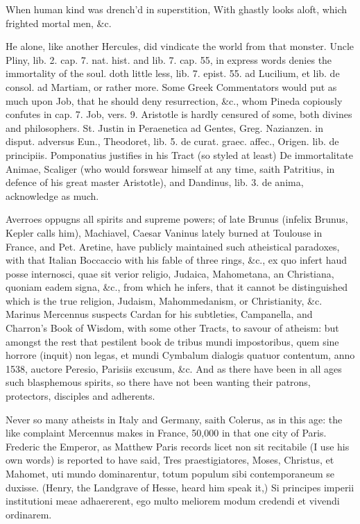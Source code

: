 {When human kind was drench'd in superstition,
With ghastly looks aloft, which frighted mortal men, \&c.

He alone, like another Hercules, did vindicate the world from that
monster. Uncle Pliny, lib. 2. cap. 7. nat. hist. and lib. 7. cap.
55, in express words denies the immortality of the soul. \Seneca
doth little less, lib. 7. epist. 55. ad Lucilium, et lib. de consol. ad
Martiam, or rather more. Some Greek Commentators would put as much upon
Job, that he should deny resurrection, \&c., whom Pineda copiously
confutes in cap. 7. Job, vers. 9. Aristotle is hardly censured of some,
both divines and philosophers. St. Justin in Peraenetica ad Gentes,
Greg. Nazianzen. in disput. adversus Eun., Theodoret, lib. 5. de curat.
graec. affec., Origen. lib. de principiis. Pomponatius justifies in his
Tract (so styled at least) De immortalitate Animae, Scaliger (who would
forswear himself at any time, saith Patritius, in defence of his great
master Aristotle), and Dandinus, lib. 3. de anima, acknowledge as much.

Averroes oppugns all spirits and supreme powers; of late Brunus
(infelix Brunus, Kepler calls him), Machiavel, Caesar Vaninus
lately burned at Toulouse in France, and Pet. Aretine, have publicly
maintained such atheistical paradoxes, with that Italian
Boccaccio with his fable of three rings, \&c., ex quo infert haud posse
internosci, quae sit verior religio, Judaica, Mahometana, an
Christiana, quoniam eadem signa, \&c., from which he infers, that it
cannot be distinguished which is the true religion, Judaism,
Mahommedanism, or Christianity, \&c. Marinus Mercennus suspects
Cardan for his subtleties, Campanella, and Charron's Book of Wisdom,
with some other Tracts, to savour of atheism: but amongst the
rest that pestilent book de tribus mundi impostoribus, quem sine
horrore (inquit) non legas, et mundi Cymbalum dialogis quatuor
contentum, anno 1538, auctore Peresio, Parisiis excusum, \&c. And
as there have been in all ages such blasphemous spirits, so there have
not been wanting their patrons, protectors, disciples and adherents.

Never so many atheists in Italy and Germany, saith Colerus, as in
this age: the like complaint Mercennus makes in France, 50,000 in that
one city of Paris. Frederic the Emperor, as Matthew Paris records
licet non sit recitabile (I use his own words) is reported to have
said, Tres praestigiatores, Moses, Christus, et Mahomet, uti mundo
dominarentur, totum populum sibi contemporaneum se duxisse. (Henry, the
Landgrave of Hesse, heard him speak it,) Si principes imperii
institutioni meae adhaererent, ego multo meliorem modum credendi et
vivendi ordinarem.

}
